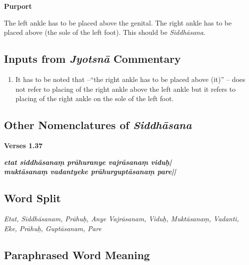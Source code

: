 \textbf{Purport}

The left ankle has to be placed above the genital. The right ankle has to be placed above (the sole of the left foot). This should be \textit{Siddhāsana}.

\subsection*{Inputs from \textit{Jyotsnā} Commentary}


\begin{enumerate}
\item It has to be noted that –“the right ankle has to be placed above (it)” – does not refer to placing of the right ankle above the left ankle but it refers to placing of the right ankle on the sole of the left foot. 
\end{enumerate}

\subsection*{Other Nomenclatures of \textit{Siddhāsana}}

\noindent \textbf{Verses 1.37}

\begin{shloka}
\textit{\textbf{etat siddhāsanaṃ prāhuranye vajrāsanaṃ viduḥ|}\\
\textbf{muktāsanaṃ vadantyeke prāhurguptāsanaṃ pare||}}
\end{shloka}
\vspace{-10pt}

\subsection*{Word Split}
\vspace{-10pt}

\textit{Etat, Siddhāsanam, Prāhuḥ, Anye Vajrāsanam, Viduḥ, Muktāsanaṃ, Vadanti, Eke, Prāhuḥ, Guptāsanam, Pare}
\vspace{-10pt}

\subsection*{Paraphrased Word Meaning}
\vspace{-10pt}

